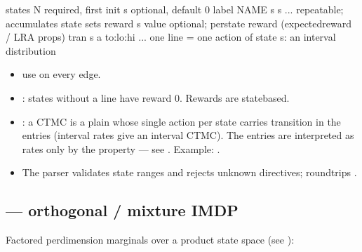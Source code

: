 \documentclass[a4paper,10pt,english]{sphinxmanual}
\begin{document}
\begin{sphinxVerbatim}[commandchars=\\\{\}]
states \PYGZlt{}N\PYGZgt{}                       \PYGZsh{} required, first
init \PYGZlt{}s\PYGZgt{}                         \PYGZsh{} optional, default 0
label \PYGZlt{}NAME\PYGZgt{} \PYGZlt{}s\PYGZgt{} \PYGZlt{}s\PYGZgt{} ...         \PYGZsh{} repeatable; accumulates state sets
reward \PYGZlt{}s\PYGZgt{} \PYGZlt{}value\PYGZgt{}               \PYGZsh{} optional; per\PYGZhy{}state reward (expected\PYGZhy{}reward / LRA props)
tran \PYGZlt{}s\PYGZgt{} \PYGZlt{}a\PYGZgt{} \PYGZlt{}to\PYGZgt{}:\PYGZlt{}lo\PYGZgt{}:\PYGZlt{}hi\PYGZgt{} ...  \PYGZsh{} one line = one action of state \PYGZlt{}s\PYGZgt{}: an interval distribution
\end{sphinxVerbatim}
\begin{itemize}
\item {} 
\sphinxAtStartPar
{} use  on every edge.

\item {} 
\sphinxAtStartPar
{}: states without a  line have reward 0. Rewards are state\sphinxhyphen{}based.

\item {} 
\sphinxAtStartPar
{}: a CTMC is a plain  whose single action per state carries
transition  in the  entries (interval rates  give an
interval CTMC). The entries are interpreted as rates only by the  property —
see {\hyperref[\detokenize{manual/ctmc-csl::doc}]{}}. Example: .

\item {} 
\sphinxAtStartPar
The parser validates state ranges and rejects unknown directives; 
round\sphinxhyphen{}trips .

\end{itemize}


\subsection{ — orthogonal / mixture IMDP}
\label{\detokenize{manual/formats:odimdp-orthogonal-mixture-imdp}}
\sphinxAtStartPar
Factored per\sphinxhyphen{}dimension marginals over a product state space (see {\hyperref[\detokenize{manual/odimdp::doc}]{}}):
\end{document}
